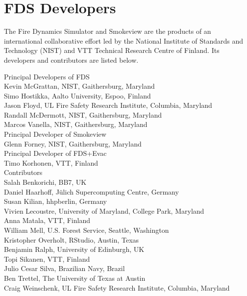 \chapter{FDS Developers}

The Fire Dynamics Simulator and Smokeview are the products of an international collaborative effort led by
the National Institute of Standards and Technology (NIST) and VTT Technical Research Centre of Finland. Its developers and
contributors are listed below.

\vspace{0.3in}

\begin{flushleft}

Principal Developers of FDS  \\ [0.2in]

Kevin McGrattan, NIST, Gaithersburg, Maryland \\
Simo Hostikka, Aalto University, Espoo, Finland \\
Jason Floyd, UL Fire Safety Research Institute, Columbia, Maryland \\
Randall McDermott, NIST, Gaithersburg, Maryland \\
Marcos Vanella, NIST, Gaithersburg, Maryland \\ [0.3in]

Principal Developer of Smokeview  \\ [0.2in]

Glenn Forney, NIST, Gaithersburg, Maryland \\ [0.3in]

Principal Developer of FDS+Evac  \\ [0.2in]

Timo Korhonen, VTT, Finland \\ [0.3in]

Contributors \\ [0.2in]

Salah Benkorichi, BB7, UK \\
Daniel Haarhoff, J\"ulich Supercomputing Centre, Germany \\
Susan Kilian, hhpberlin, Germany \\
Vivien Lecoustre, University of Maryland, College Park, Maryland \\
Anna Matala, VTT, Finland \\
William Mell, U.S. Forest Service, Seattle, Washington \\
Kristopher Overholt, RStudio, Austin, Texas \\
Benjamin Ralph, University of Edinburgh, UK \\
Topi Sikanen, VTT, Finland \\
Julio Cesar Silva, Brazilian Navy, Brazil \\
Ben Trettel, The University of Texas at Austin \\
Craig Weinschenk, UL Fire Safety Research Institute, Columbia, Maryland

\end{flushleft}



